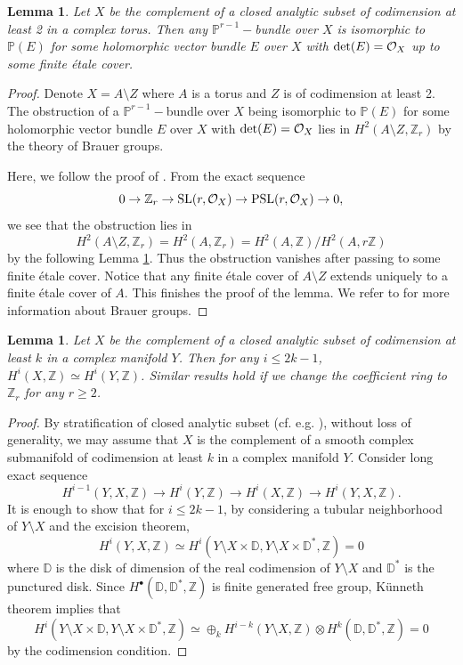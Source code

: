 \documentclass[a4, 12pt]{amsart}
\newtheorem{lem}[thm]{Lemma}
\numberwithin{equation}{section}
\theoremstyle{definition}
\def\Z{\mathbb{Z}}
\def\P{\mathbb{P}}
\def\P{\mathbb{P}}
\def \det{\mathrm{det}}
\begin{document}
\begin{lem}\label{Lem4.1}
Let $X$ be the complement of a closed analytic subset of codimension at least 2 in a complex torus.
Then any $\P^{r-1}-$bundle over $X$ is isomorphic to $\P(E)$ for some holomorphic vector bundle $E$ over $X$ with $\det(E)=\cO_X$ up to some finite \'etale cover.
\end{lem}
\begin{proof}
Denote $X=A\setminus Z$ where $A$ is a torus and $Z$ is of codimension at least 2.
The obstruction of a $\P^{r-1}-$bundle over $X$ being isomorphic to $\P(E)$ for some holomorphic vector bundle $E$ over $X$ with $\det(E)=\cO_X$ lies in $H^2(A \setminus Z, \Z_r)$ by the theory of Brauer groups.

Here, we
follow the proof of \cite[Lemma 7.4]{CP91}.
From the exact sequence
$$0 \to \Z_r \to \mathrm{SL}(r, \cO_X) \to \mathrm{PSL} (r, \cO_X) \to 0, $$
we see that the obstruction lies in
$$H^2(A \setminus Z, \Z_r)=H^2(A, \Z_r)=H^2(A, \Z)/H^2(A, r\Z)$$
by the following Lemma \ref{Lem4.2}.
Thus the obstruction vanishes after passing to some finite \'etale cover.
Notice that any finite \'etale cover of $A \setminus Z$ extends uniquely to a finite \'etale cover of $A$.
This finishes the proof of the lemma.
We refer to \cite{El82} for more information about Brauer groups.
\end{proof}
\begin{lem}\label{Lem4.2}
Let $X$ be the complement of a closed analytic subset of codimension at least $k$ in a complex manifold $Y$.
Then for any $i \leq 2k-1$, $H^i(X, \Z) \simeq H^i(Y,\Z)$.
Similar results hold if we change the coefficient ring to $\Z_r$ for any $r \geq 2$.
\end{lem}
\begin{proof}
By stratification of closed analytic subset (cf. e.g. \cite[Chap II, Proposition 5.6]{agbook}), without loss of generality, we may assume that $X$ is the complement of a smooth complex submanifold of codimension at least $k$ in a complex manifold $Y$.
Consider long exact sequence
$$H^{i-1}(Y, X, \Z) \to H^i(Y, \Z) \to H^i(X, \Z) \to H^i(Y, X, \Z).$$
It is enough to show that for $i \leq 2k-1$, by considering a tubular neighborhood of $Y \setminus X$ and the excision theorem,
$$H^i(Y, X, \Z) \simeq H^i( Y \setminus X \times  \mathbb{D},  Y \setminus X \times  \mathbb{D}^*,\Z)=0$$
where $\mathbb{D}$ is the disk of dimension of the real codimension of $Y \setminus X$ and $\mathbb{D}^*$ is the punctured disk.
Since $H^\bullet(\mathbb{D}, \mathbb{D}^*,\Z)$ is finite generated free group, K\"unneth theorem implies that
$$H^i( Y \setminus X \times  \mathbb{D},  Y \setminus X \times  \mathbb{D}^*,\Z) \simeq \oplus_k H^{i-k}(Y \setminus X, \Z) \otimes H^k(\mathbb{D}, \mathbb{D}^*, \Z)=0$$
by the codimension condition.
\end{proof}
\end{document}
